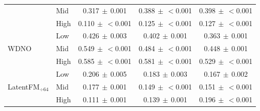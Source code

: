 \begin{table}[ht]
{\begin{tabular}{llccc}
 & Mid & 0.317{\scriptsize$\,\pm\,$0.001} & 0.388{\scriptsize$\,\pm\,$$<$0.001} & 0.398{\scriptsize$\,\pm\,$$<$0.001} \\
 & High & 0.110{\scriptsize$\,\pm\,$$<$0.001} & 0.125{\scriptsize$\,\pm\,$$<$0.001} & 0.127{\scriptsize$\,\pm\,$$<$0.001} \\
\midrule
\multirow{3}{*}{WDNO} & Low & 0.426{\scriptsize$\,\pm\,$0.003} & 0.402{\scriptsize$\,\pm\,$0.001} & 0.363{\scriptsize$\,\pm\,$0.001} \\
 & Mid & 0.549{\scriptsize$\,\pm\,$$<$0.001} & 0.484{\scriptsize$\,\pm\,$$<$0.001} & 0.448{\scriptsize$\,\pm\,$0.001} \\
 & High & 0.585{\scriptsize$\,\pm\,$$<$0.001} & 0.581{\scriptsize$\,\pm\,$$<$0.001} & 0.529{\scriptsize$\,\pm\,$$<$0.001} \\
\midrule
\multirow{3}{*}{LatentFM$_{\div 64}$} & Low & 0.206{\scriptsize$\,\pm\,$0.005} & 0.183{\scriptsize$\,\pm\,$0.003} & 0.167{\scriptsize$\,\pm\,$0.002} \\
 & Mid & 0.177{\scriptsize$\,\pm\,$0.001} & 0.149{\scriptsize$\,\pm\,$$<$0.001} & 0.151{\scriptsize$\,\pm\,$$<$0.001} \\
 & High & 0.111{\scriptsize$\,\pm\,$0.001} & 0.139{\scriptsize$\,\pm\,$0.001} & 0.196{\scriptsize$\,\pm\,$$<$0.001} \\
\bottomrule
\end{tabular}
}
\end{table}
